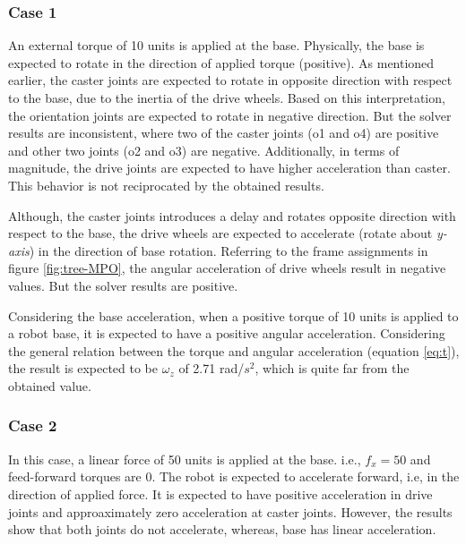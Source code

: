 \subsubsection*{Case 1}
\hspace{20pt}An external torque of 10 units is applied at the base. Physically, the base is expected to rotate in the direction of applied torque (positive). As mentioned earlier, the caster joints are expected to rotate in opposite direction with respect to the base, due to the inertia of the drive wheels. Based on this interpretation, the orientation joints are expected to rotate in negative direction. But the solver results are inconsistent, where two of the caster joints (o1 and o4) are positive and other two joints (o2 and o3) are negative. Additionally, in terms of magnitude, the drive joints are expected to have higher acceleration than caster. This behavior is not reciprocated by the obtained results. 


Although, the caster joints introduces a delay and rotates opposite direction with respect to the base, the drive wheels are expected to accelerate (rotate about \textit{y-axis}) in the direction of base rotation. Referring to the frame assignments in figure \ref{fig:tree-MPO}, the angular acceleration of drive wheels result in negative values. But the solver results are positive.  

Considering the base acceleration, when a positive torque of 10 units is applied to a robot base, it is expected to have a positive angular acceleration. Considering the general relation between the torque and angular acceleration (equation \ref{eq:t}), the result is expected to be $\omega_z$ of 2.71 rad/$s^2$, which is quite far from the obtained value.

\subsubsection*{Case 2}
\hspace{20pt}In this case, a linear force of 50 units is applied at the base. i.e., $f_x = 50$ and feed-forward torques are 0. The robot is expected to accelerate forward, i.e, in the direction of applied force. It is expected to have positive acceleration in drive joints and approaximately zero acceleration at caster joints. However, the results show that both joints do not accelerate, whereas, base has linear acceleration.

